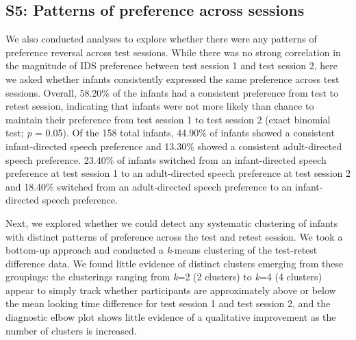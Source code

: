 \documentclass[
  man, donotrepeattitle,floatsintext]{apa6}
\begin{document}
\hypertarget{s5-patterns-of-preference-across-sessions}{%
\subsection{S5: Patterns of preference across sessions}\label{s5-patterns-of-preference-across-sessions}}

We also conducted analyses to explore whether there were any patterns of preference reversal across test sessions.
While there was no strong correlation in the magnitude of IDS preference between test session 1 and test session 2, here we asked whether infants consistently expressed the same preference across test sessions.
Overall, 58.20\% of the infants had a consistent preference from test to retest session, indicating that infants were not more likely than chance to maintain their preference from test session 1 to test session 2 (exact binomial test; \emph{p} =
0.05).
Of the 158 total infants, 44.90\% of infants showed a consistent infant-directed speech preference and 13.30\% showed a consistent adult-directed speech preference.
23.40\% of infants switched from an infant-directed speech preference at test session 1 to an adult-directed speech preference at test session 2 and 18.40\% switched from an adult-directed speech preference to an infant-directed speech preference.

Next, we explored whether we could detect any systematic clustering of infants with distinct patterns of preference across the test and retest session.
We took a bottom-up approach and conducted a \emph{k}-means clustering of the test-retest difference data.
We found little evidence of distinct clusters emerging from these groupings: the clusterings ranging from \emph{k}=2 (2 clusters) to \emph{k}=4 (4 clusters) appear to simply track whether participants are approximately above or below the mean looking time difference for test session 1 and test session 2, and the diagnostic elbow plot shows little evidence of a qualitative improvement as the number of clusters is increased.
\end{document}
